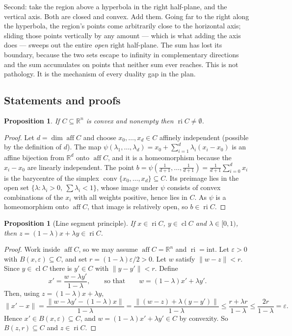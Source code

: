 \documentclass[11pt,a4paper]{article}
\theoremstyle{definition}
\theoremstyle{plain}
\newtheorem{proposition}[theorem]{Proposition}
\theoremstyle{remark}
\newcommand{\R}{\mathbb{R}}
\newcommand{\norm}[1]{\lVert #1\rVert}
\DeclareMathOperator{\conv}{conv}
\DeclareMathOperator{\aff}{aff}
\DeclareMathOperator{\ri}{ri}
\DeclareMathOperator{\cl}{cl}
\begin{document}
Second: take the region above a hyperbola in the right half-plane, and the vertical axis. Both
are closed and convex. Add them. Going far to the right along the hyperbola, the region's points
come arbitrarily close to the horizontal axis; sliding those points vertically by any amount ---
which is what adding the axis does --- sweeps out the entire \emph{open} right half-plane. The
sum has lost its boundary, because the two sets escape to infinity in complementary directions
and the sum accumulates on points that neither sum ever reaches. This is not pathology. It is
the mechanism of every duality gap in the plan.

\subsection*{Statements and proofs}

\begin{proposition}
\label{prop:rinonempty}
If $C\subseteq\R^n$ is convex and nonempty then $\ri C\ne\emptyset$.
\end{proposition}

\begin{proof}
Let $d=\dim\aff C$ and choose $x_0,\dots,x_d\in C$ affinely independent (possible by the
definition of $d$). The map $\psi(\lambda_1,\dots,\lambda_d)=x_0+\sum_{i=1}^d\lambda_i(x_i-x_0)$
is an affine bijection from $\R^d$ onto $\aff C$, and it is a homeomorphism because the
$x_i-x_0$ are linearly independent. The point
$b=\psi(\tfrac1{d+1},\dots,\tfrac1{d+1})=\tfrac1{d+1}\sum_{i=0}^dx_i$ is the barycentre of the
simplex $\conv\{x_0,\dots,x_d\}\subseteq C$. Its preimage lies in the open set
$\{\lambda:\lambda_i>0,\ \sum\lambda_i<1\}$, whose image under $\psi$ consists of convex
combinations of the $x_i$ with all weights positive, hence lies in $C$. As $\psi$ is a
homeomorphism onto $\aff C$, that image is relatively open, so $b\in\ri C$.
\end{proof}

\begin{proposition}[Line segment principle]
\label{prop:segment}
If $x\in\ri C$, $y\in\cl C$ and $\lambda\in[0,1)$, then $z=(1-\lambda)x+\lambda y\in\ri C$.
\end{proposition}

\begin{proof}
Work inside $\aff C$, so we may assume $\aff C=\R^n$ and $\ri=\mathrm{int}$. Let $\varepsilon>0$
with $B(x,\varepsilon)\subseteq C$, and set $r=(1-\lambda)\varepsilon/2>0$. Let $w$ satisfy
$\norm{w-z}<r$. Since $y\in\cl C$ there is $y'\in C$ with $\norm{y-y'}<r$. Define
\[
x'=\frac{w-\lambda y'}{1-\lambda},\qquad\text{so that}\qquad w=(1-\lambda)x'+\lambda y' .
\]
Then, using $z=(1-\lambda)x+\lambda y$,
\[
\norm{x'-x}=\frac{\norm{w-\lambda y'-(1-\lambda)x}}{1-\lambda}
=\frac{\norm{(w-z)+\lambda(y-y')}}{1-\lambda}
\le\frac{r+\lambda r}{1-\lambda}\le\frac{2r}{1-\lambda}=\varepsilon .
\]
Hence $x'\in B(x,\varepsilon)\subseteq C$, and $w=(1-\lambda)x'+\lambda y'\in C$ by convexity.
So $B(z,r)\subseteq C$ and $z\in\ri C$.
\end{proof}
\end{document}
